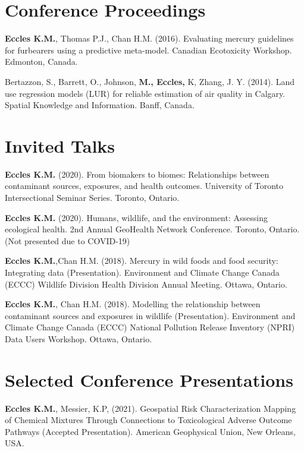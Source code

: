 \documentclass[margin,line]{res}
\begin{document}
\begin{resume}
\vspace*{.1in}
\section{\sc Conference Proceedings}
\textbf{Eccles K.M.}, Thomas P.J., Chan H.M. (2016). Evaluating mercury guidelines for furbearers using a predictive meta-model. Canadian Ecotoxicity Workshop. Edmonton, Canada.

Bertazzon, S., Barrett, O., Johnson, \textbf{M., Eccles,} K, Zhang, J. Y. (2014). Land use regression models (LUR) for reliable estimation of air quality in Calgary. Spatial Knowledge and Information. Banff, Canada.\\

\vspace*{.1in}
\section{\sc Invited Talks}
\textbf{Eccles K.M. }(2020). From biomakers to biomes: Relationships between contaminant sources, exposures, and health outcomes. University of Toronto Intersectional Seminar Series. Toronto, Ontario.

\textbf{Eccles K.M. }(2020). Humans, wildlife, and the environment: Assessing ecological health. 2nd Annual GeoHealth Network Conference. Toronto, Ontario. (Not presented due to COVID-19)

\textbf{Eccles K.M.},Chan H.M. (2018). Mercury in wild foods and food security: Integrating data (Presentation). Environment and Climate Change Canada (ECCC) Wildlife Division Health Division Annual Meeting. Ottawa, Ontario.

\textbf{Eccles K.M.}, Chan H.M. (2018). Modelling the relationship between contaminant sources and exposures in wildlife (Presentation). Environment and Climate Change Canada (ECCC) National Pollution Release Inventory (NPRI) Data Users Workshop. Ottawa, Ontario.

\vspace*{.1in}
\section{\sc Selected Conference Presentations}

\textbf{Eccles K.M.}, Messier, K.P, (2021). Geospatial Risk Characterization Mapping of Chemical Mixtures Through Connections to Toxicological Adverse Outcome Pathways (Accepted Presentation). American Geophysical Union, New Orleans, USA.


\end{resume}
\end{document}
